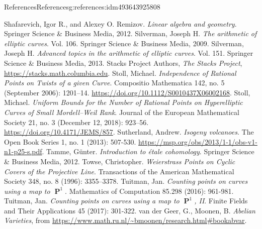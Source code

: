 \documentclass[oneside,10pt,]{book}
\numberwithin{equation}{section}
\DeclareMathOperator{\PP}{\mathbf{P}}
\begin{document}
\begin{references-chapter-numberless}{References}{}{References}{}{}{g:references:idm493643925808}
\begin{thebibliography}{9}
\hypertarget{x:biblio:bib-shafarevich-remizov}{}Shafarevich, Igor R., and Alexey O. Remizov. \textit{Linear algebra and geometry}. Springer Science \& Business Media, 2012.
\hypertarget{x:biblio:bib-silverman}{}Silverman, Joseph H. \textit{The arithmetic of elliptic curves}. Vol. 106. Springer Science \& Business Media, 2009.
\hypertarget{x:biblio:bib-silverman-advanced}{}Silverman, Joseph H. \textit{Advanced topics in the arithmetic of elliptic curves}. Vol. 151. Springer Science \& Business Media, 2013.
\hypertarget{x:biblio:bib-stacks}{}Stacks Project Authors, \textit{The Stacks Project}, \url{https://stacks.math.columbia.edu}.
\hypertarget{x:biblio:bib-stoll-independence}{}Stoll, Michael. \textit{Independence of Rational Points on Twists of a given Curve}. Compositio Mathematica 142, no. 5 (September 2006): 1201–14. \url{https://doi.org/10.1112/S0010437X06002168}.
\hypertarget{x:biblio:bib-stoll-uniform}{}Stoll, Michael. \textit{Uniform Bounds for the Number of Rational Points on Hyperelliptic Curves of Small Mordell–Weil Rank}. Journal of the European Mathematical Society 21, no. 3 (December 12, 2018): 923–56. \url{https://doi.org/10.4171/JEMS/857}.
\hypertarget{x:biblio:bib-sutherland}{}Sutherland, Andrew. \textit{Isogeny volcanoes}. The Open Book Series 1, no. 1 (2013): 507-530. \url{https://msp.org/obs/2013/1-1/obs-v1-n1-p25-s.pdf}.
\hypertarget{x:biblio:bib-tamme}{}Tamme, Günter. \textit{Introduction to étale cohomology}. Springer Science \& Business Media, 2012.
\hypertarget{x:biblio:bib-towse}{}Towse, Christopher. \textit{Weierstrass Points on Cyclic Covers of the Projective Line}. Transactions of the American Mathematical Society 348, no. 8 (1996): 3355–3378.
\hypertarget{x:biblio:bib-tuitman-map-to-p1-1}{}Tuitman, Jan. \textit{Counting points on curves using a map to \(\PP^1\)}. Mathematics of Computation 85.298 (2016): 961-981.
\hypertarget{x:biblio:bib-tuitman-map-to-p1-2}{}Tuitman, Jan. \textit{Counting points on curves using a map to \(\PP^1\), II}. Finite Fields and Their Applications 45 (2017): 301-322.
\hypertarget{x:biblio:bib-vandergeer-moonen}{}van der Geer, G., Moonen, B. \textit{Abelian Varieties}, from \url{https://www.math.ru.nl/\~bmoonen/research.html\#bookabvar}.

\end{thebibliography}
\end{references-chapter-numberless}
\end{document}
